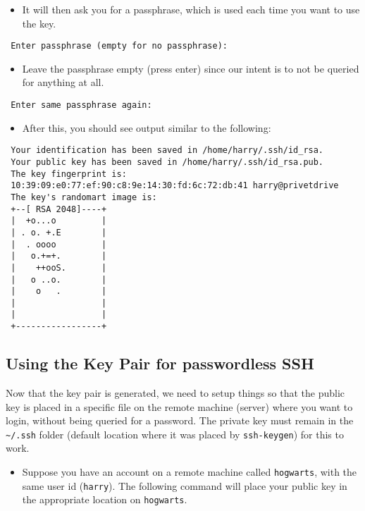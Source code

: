 \documentclass[a4paper,10pt,titlepage]{article}
\begin{document}
\begin{itemize}
\item It will then ask you for a passphrase, which is used each time you
    want to use the key.
\end{itemize}

\begin{verbatim}
 Enter passphrase (empty for no passphrase):
\end{verbatim}

\begin{itemize}
\item Leave the passphrase empty (press enter) since our intent is to
    not be queried for anything at all.
\end{itemize}

\begin{verbatim}
 Enter same passphrase again:
\end{verbatim}

\begin{itemize}
\item After this, you should see output similar to the following:
\end{itemize}

\begin{verbatim}
 Your identification has been saved in /home/harry/.ssh/id_rsa.
 Your public key has been saved in /home/harry/.ssh/id_rsa.pub.
 The key fingerprint is:
 10:39:09:e0:77:ef:90:c8:9e:14:30:fd:6c:72:db:41 harry@privetdrive
 The key's randomart image is:
 +--[ RSA 2048]----+
 |  +o...o         |
 | . o. +.E        |
 |  . oooo         |
 |   o.+=+.        |
 |    ++ooS.       |
 |   o ..o.        |
 |    o   .        |
 |                 |
 |                 |
 +-----------------+
\end{verbatim}
\subsection{Using the Key Pair for passwordless SSH}


   Now that the key pair is generated, we need to setup things so that
   the public key is placed in a specific file on the remote machine
   (server) where you want to login, without being queried for a
   password. The private key must remain in the \texttt{\textasciitilde{}/.ssh} folder
   (default location where it was placed by \texttt{ssh-keygen}) for this to
   work.

\begin{itemize}
\item Suppose you have an account on a remote machine called
     \texttt{hogwarts}, with the same user id (\texttt{harry}). The following
     command will place your public key in the appropriate location on
     \texttt{hogwarts}.
\end{itemize}
\end{document}
